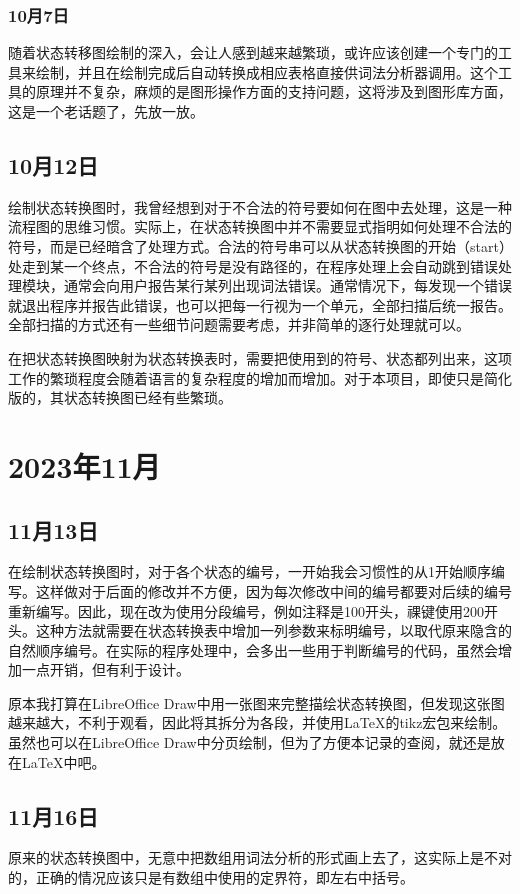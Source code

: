 \subsubsection{10月7日}
随着状态转移图绘制的深入，会让人感到越来越繁琐，或许应该创建一个专门的工具来绘制，并且在绘制完成后自动转换成相应表格直接供词法分析器调用。这个工具的原理并不复杂，麻烦的是图形操作方面的支持问题，这将涉及到图形库方面，这是一个老话题了，先放一放。


\subsection{10月12日}
绘制状态转换图时，我曾经想到对于不合法的符号要如何在图中去处理，这是一种流程图的思维习惯。实际上，在状态转换图中并不需要显式指明如何处理不合法的符号，而是已经暗含了处理方式。合法的符号串可以从状态转换图的开始（start）处走到某一个终点，不合法的符号是没有路径的，在程序处理上会自动跳到错误处理模块，通常会向用户报告某行某列出现词法错误。通常情况下，每发现一个错误就退出程序并报告此错误，也可以把每一行视为一个单元，全部扫描后统一报告。全部扫描的方式还有一些细节问题需要考虑，并非简单的逐行处理就可以。

在把状态转换图映射为状态转换表时，需要把使用到的符号、状态都列出来，这项工作的繁琐程度会随着语言的复杂程度的增加而增加。对于本项目，即使只是简化版的，其状态转换图已经有些繁琐。


\section{2023年11月}


\subsection{11月13日}
在绘制状态转换图时，对于各个状态的编号，一开始我会习惯性的从1开始顺序编写。这样做对于后面的修改并不方便，因为每次修改中间的编号都要对后续的编号重新编写。因此，现在改为使用分段编号，例如注释是100开头，祼键使用200开头。这种方法就需要在状态转换表中增加一列参数来标明编号，以取代原来隐含的自然顺序编号。在实际的程序处理中，会多出一些用于判断编号的代码，虽然会增加一点开销，但有利于设计。

原本我打算在LibreOffice Draw中用一张图来完整描绘状态转换图，但发现这张图越来越大，不利于观看，因此将其拆分为各段，并使用LaTeX的tikz宏包来绘制。虽然也可以在LibreOffice Draw中分页绘制，但为了方便本记录的查阅，就还是放在LaTeX中吧。


\subsection{11月16日}
原来的状态转换图中，无意中把数组用词法分析的形式画上去了，这实际上是不对的，正确的情况应该只是有数组中使用的定界符，即左右中括号。


